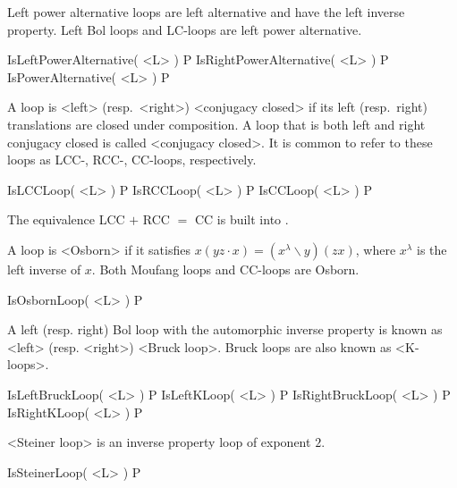 Left power alternative loops are left alternative and have the
left inverse property. Left Bol loops and LC-loops are left power
alternative.

\>IsLeftPowerAlternative( <L> ) P
\>IsRightPowerAlternative( <L> ) P
\>IsPowerAlternative( <L> ) P


\noindent A loop is <left> (resp.\ <right>) <conjugacy
closed> if
its left (resp.\ right) translations are closed under composition. A loop that
is both left and right conjugacy closed is called <conjugacy
closed>. It is common to refer to these loops as
LCC-, RCC-, CC-loops, respectively.

\>IsLCCLoop( <L> ) P
\>IsRCCLoop( <L> ) P
\>IsCCLoop( <L> ) P

The equivalence LCC $+$ RCC $=$ CC is built into {\LOOPS}.

A loop is <Osborn> if it satisfies $x(yz\cdot
x)=(x^\lambda\backslash y)(zx)$, where $x^\lambda$ is the left inverse of $x$. Both
Moufang loops and CC-loops are Osborn.

\>IsOsbornLoop( <L> ) P


A left (resp. right) Bol loop with the automorphic inverse property
is known as <left> (resp. <right>) <Bruck loop>. Bruck loops are also known as
<K-loops>.

\>IsLeftBruckLoop( <L> ) P
\>IsLeftKLoop( <L> ) P
\>IsRightBruckLoop( <L> ) P
\>IsRightKLoop( <L> ) P

<Steiner loop>
%
%
 is an inverse property loop of exponent $2$.

\>IsSteinerLoop( <L> ) P

